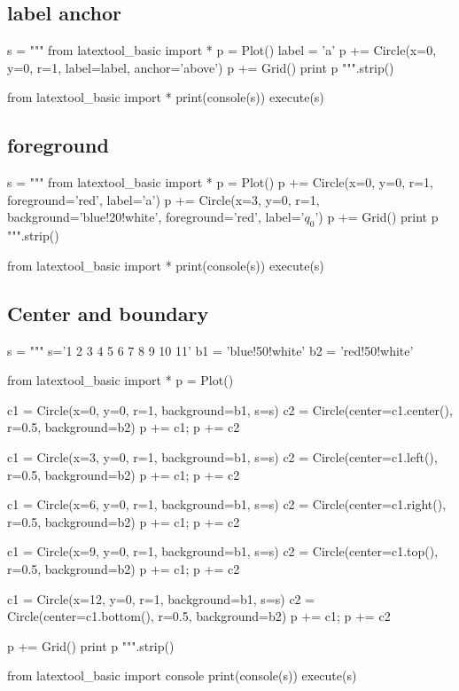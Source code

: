 \newpage
\subsection{label anchor}
\begin{python}
s = """
from latextool_basic import *
p = Plot()
label = 'a'
p += Circle(x=0, y=0, r=1, label=label, anchor='above')
p += Grid()
print p
""".strip()

from latextool_basic import *
print(console(s))
execute(s)
\end{python}




\newpage
\subsection{foreground}
\begin{python}
s = """
from latextool_basic import *
p = Plot()
p += Circle(x=0, y=0, r=1, foreground='red', label='a')
p += Circle(x=3, y=0, r=1, background='blue!20!white', 
                           foreground='red', label='$q_0$')
p += Grid()
print p
""".strip()

from latextool_basic import *
print(console(s))
execute(s)
\end{python}




\newpage
\subsection{Center and boundary}
\begin{python}
s = """
s='1 2 3 4 5 6 7 8 9 10 11'
b1 = 'blue!50!white'
b2 = 'red!50!white'

from latextool_basic import *
p = Plot()

c1 = Circle(x=0, y=0, r=1, background=b1, s=s)
c2 = Circle(center=c1.center(), r=0.5, background=b2)
p += c1; p += c2

c1 = Circle(x=3, y=0, r=1, background=b1, s=s)
c2 = Circle(center=c1.left(), r=0.5, background=b2)
p += c1; p += c2

c1 = Circle(x=6, y=0, r=1, background=b1, s=s)
c2 = Circle(center=c1.right(), r=0.5, background=b2)
p += c1; p += c2

c1 = Circle(x=9, y=0, r=1, background=b1, s=s)
c2 = Circle(center=c1.top(), r=0.5, background=b2)
p += c1; p += c2

c1 = Circle(x=12, y=0, r=1, background=b1, s=s)
c2 = Circle(center=c1.bottom(), r=0.5, background=b2)
p += c1; p += c2

p += Grid()
print p
""".strip()

from latextool_basic import console
print(console(s))
execute(s)
\end{python}






